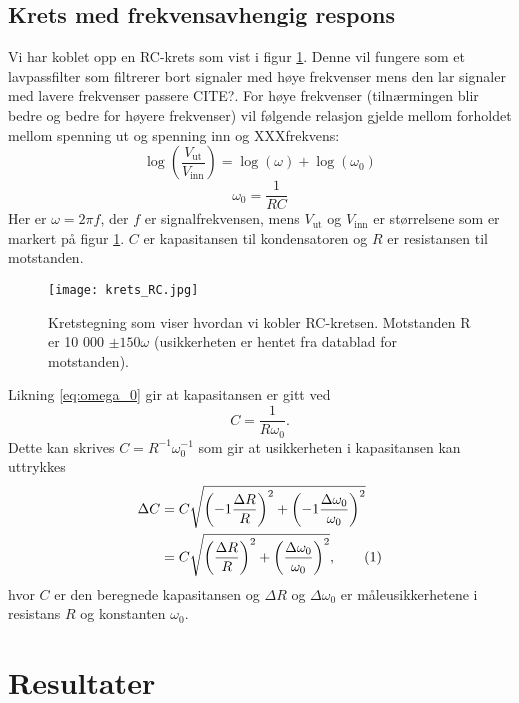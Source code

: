 \documentclass[reprint, english,notitlepage]{revtex4-1}  %
\newcommand\numberthis{\addtocounter{equation}{1}\tag{\theequation}}
\begin{document}
\subsection{Krets med frekvensavhengig respons}
Vi har koblet opp en RC-krets som vist i figur \ref{fig:krets_RC}. Denne vil fungere som et lavpassfilter som filtrerer bort signaler med høye frekvenser mens den lar signaler med lavere frekvenser passere CITE?. For høye frekvenser (tilnærmingen blir bedre og bedre for høyere frekvenser) vil følgende relasjon gjelde mellom forholdet mellom spenning ut og spenning inn og XXXfrekvens:
\begin{equation}
  \log \left( \frac{V_{\text{ut}}}{V_{\text{inn}}} \right) = \log (\omega) + \log (\omega_0) \label{eq:lavpass}
\end{equation}
\begin{equation}
  \omega_0 = \frac{1}{RC} \label{eq:omega_0}
\end{equation}
Her er $\omega = 2 \pi f$, der $f$ er signalfrekvensen, mens $V_{\text{ut}}$ og $V_{\text{inn}}$ er størrelsene som er markert på figur \ref{fig:krets_RC}. $C$ er kapasitansen til kondensatoren og $R$ er resistansen til motstanden.
\begin{figure}
  \texttt{[image: krets\_RC.jpg]}
  \caption{Kretstegning som viser hvordan vi kobler RC-kretsen. Motstanden R er 10 000 $\pm 150 \omega$ (usikkerheten er hentet fra datablad for motstanden).}
  \label{fig:krets_RC}
\end{figure}


Likning \ref{eq:omega_0} gir at kapasitansen er gitt ved
\begin{equation}
  \label{eq:kapasitans}
  C = \frac{1}{R \omega_0}.
\end{equation}
Dette kan skrives $C = R^{-1} \omega_0^{-1}$ som gir at usikkerheten i kapasitansen kan uttrykkes
\begin{align*}
  \Delta C &= C \sqrt{\left( -1 \frac{\Delta R}{R} \right) ^2 + \left( -1 \frac{\Delta \omega_0}{\omega_0} \right) ^2} \\
  &= C \sqrt{\left( \frac{\Delta R}{R} \right) ^2 + \left( \frac{\Delta \omega_0}{\omega_0} \right) ^2}, \numberthis \label{eq:usikkerhet_C}
\end{align*}
hvor $C$ er den beregnede kapasitansen og $\Delta R$ og $\Delta \omega_0$ er måleusikkerhetene i resistans $R$ og konstanten $\omega_0$.


\section{Resultater}
\end{document}
